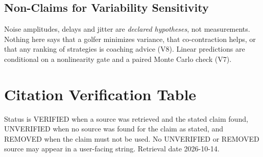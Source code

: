 \documentclass[11pt,a4paper]{article}
\begin{document}
\subsection{Non-Claims for Variability Sensitivity}
\label{sec:var-nonclaims}

Noise amplitudes, delays and jitter are \emph{declared hypotheses}, not
measurements.  Nothing here says that a golfer minimizes variance, that
co-contraction helps, or that any ranking of strategies is coaching advice
(V8).  Linear predictions are conditional on a nonlinearity gate and a paired
Monte Carlo check (V7).

\section{Citation Verification Table}
\label{sec:citations}

Status is VERIFIED when a source was retrieved and the stated claim found,
UNVERIFIED when no source was found for the claim as stated, and REMOVED when
the claim must not be used.  No UNVERIFIED or REMOVED source may appear in a
user-facing string.  Retrieval date 2026-10-14.
\end{document}
